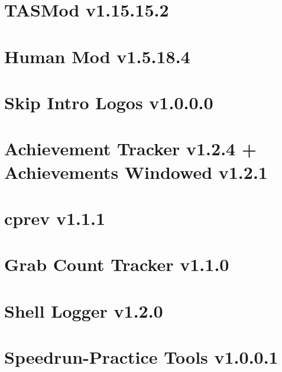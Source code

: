 \documentclass[lualatex,a4paper,fontsize=11pt,jafontscale=0.9247,titlepage,oneside]{jlreq}
\begin{document}
\section{TASMod v1.15.15.2}
\section{Human Mod v1.5.18.4}
\section{Skip Intro Logos v1.0.0.0}
\section{Achievement Tracker v1.2.4 + Achievements Windowed v1.2.1}
\section{cprev v1.1.1}
\section{Grab Count Tracker v1.1.0}
\section{Shell Logger v1.2.0}
\section{Speedrun-Practice Tools v1.0.0.1}
\end{document}
